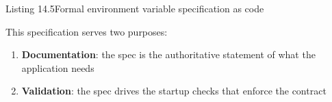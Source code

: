 \begin{codeboxcap}{\textcolor{accent}{Listing 14.5}\enspace Formal environment variable specification as code}
\begin{Shaded}
\begin{Highlighting}[]
            \NormalTok{:}
\OperatorTok{=}
            \NormalTok{ (}\NormalTok{, }\NormalTok{):}
\OperatorTok{=} 
             
\SpecialCharTok{\{}\SpecialCharTok{\}}\SpecialCharTok{\{}\SpecialCharTok{\}}\NormalTok{)}
\SpecialCharTok{\{}\SpecialCharTok{\}}\NormalTok{)}

\OperatorTok{=}

        \NormalTok{(}\NormalTok{, }\OperatorTok{=}
            \OperatorTok{=}
\NormalTok{)}

\end{Highlighting}
\end{Shaded}

\end{codeboxcap}

\noindent{}This specification serves two purposes:

\begin{enumerate}
\def\labelenumi{\arabic{enumi}.}
\tightlist
\item
  \textbf{Documentation}: the spec is the authoritative statement of what the application needs
\item
  \textbf{Validation}: the spec drives the startup checks that enforce the contract
\end{enumerate}

\label{14-runtime-contract:the-complete-runtime-contract-document}

